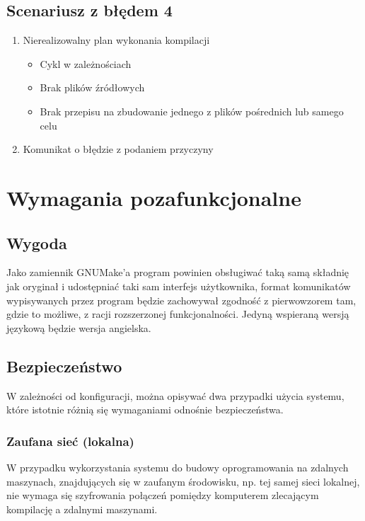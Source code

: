 \documentclass[a4paper]{article}
\begin{document}
\subsection{Scenariusz z błędem 4}

\begin{enumerate}
	\item Nierealizowalny plan wykonania kompilacji
		\begin{itemize}
			\item Cykl w zależnościach
			\item Brak plików źródłowych
			\item Brak przepisu na zbudowanie jednego z plików pośrednich lub samego celu
		\end{itemize}
	\item Komunikat o błędzie z podaniem przyczyny
\end{enumerate}


\section{Wymagania pozafunkcjonalne}

\subsection{Wygoda}

Jako zamiennik GNUMake’a program powinien obsługiwać taką samą składnię jak oryginał i udostępniać taki sam interfejs użytkownika, format komunikatów wypisywanych przez program będzie zachowywał zgodność z pierwowzorem tam, gdzie to możliwe, z racji rozszerzonej funkcjonalności.
Jedyną wspieraną wersją językową będzie wersja angielska.


\subsection{Bezpieczeństwo}

W zależności od konfiguracji, można opisywać dwa przypadki użycia systemu, które istotnie różnią się wymaganiami odnośnie bezpieczeństwa.

\subsubsection{Zaufana sieć (lokalna)}

W przypadku wykorzystania systemu do budowy oprogramowania na zdalnych maszynach, znajdujących się w zaufanym środowisku, np. tej samej sieci lokalnej, nie wymaga się szyfrowania połączeń pomiędzy komputerem zlecającym kompilację a zdalnymi maszynami.
\end{document}
